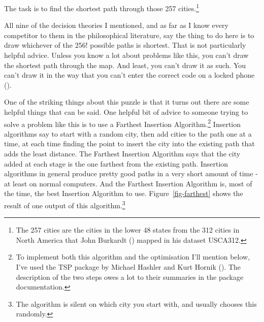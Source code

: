 \documentclass[
  11pt,
  letterpaper,
  DIV=11,
  numbers=noendperiod,
  twoside]{scrartcl}
\begin{document}
The task is to find the shortest path through those 257
cities.\footnote{The 257 cities are the cities in the lower 48 states
  from the 312 cities in North America that John Burkardt
  () mapped in his dataset USCA312.}

All nine of the decision theories I mentioned, and as far as I know
every competitor to them in the philosophical literature, say the thing
to do here is to draw whichever of the 256! possible paths is shortest.
That is not particularly helpful advice. Unless you know a lot about
problems like this, you can't draw the shortest path through the map.
And least, you can't draw it as such. You can't draw it in the way that
you can't enter the correct code on a locked phone
().

One of the striking things about this puzzle is that it turns out there
are some helpful things that can be said. One helpful bit of advice to
someone trying to solve a problem like this is to use a Farthest
Insertion Algorithm.\footnote{To implement both this algorithm and the
  optimisation I'll mention below, I've used the TSP package by Michael
  Hashler and Kurt Hornik (). The
  description of the two steps owes a lot to their summaries in the
  package documentation.} Insertion algorithms say to start with a
random city, then add cities to the path one at a time, at each time
finding the point to insert the city into the existing path that adds
the least distance. The Farthest Insertion Algorithm says that the city
added at each stage is the one farthest from the existing path.
Insertion algorithms in general produce pretty good paths in a very
short amount of time - at least on normal computers. And the Farthest
Insertion Algorithm is, most of the time, the best Insertion Algorithm
to use. Figure~\ref{fig-farthest} shows the result of one output of this
algorithm.\footnote{The algorithm is silent on which city you start
  with, and usually chooses this randomly.}
\end{document}
